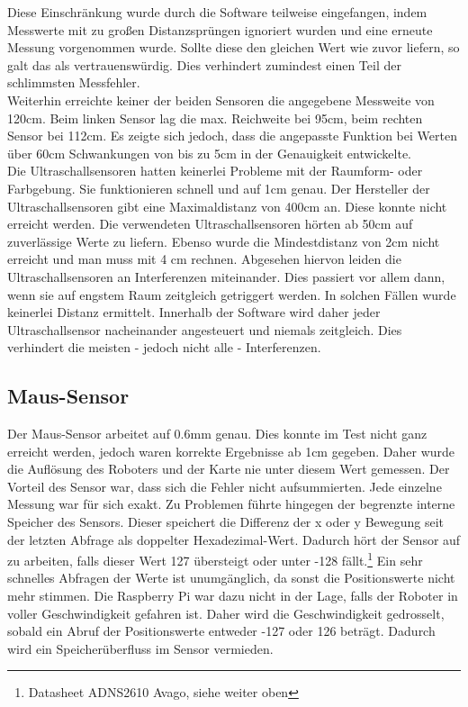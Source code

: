 \documentclass[twoside,11pt, a4paper]{report}
\begin{document}
	Diese Einschränkung wurde durch die Software teilweise eingefangen, indem Messwerte mit zu großen Distanzsprüngen ignoriert wurden und eine erneute Messung vorgenommen wurde. Sollte diese den gleichen Wert wie zuvor liefern, so galt das als vertrauenswürdig. Dies verhindert zumindest einen Teil der schlimmsten Messfehler. \\
	Weiterhin erreichte keiner der beiden Sensoren die angegebene Messweite von 120cm. Beim linken Sensor lag die max. Reichweite bei 95cm, beim rechten Sensor bei 112cm. Es zeigte sich jedoch, dass die angepasste Funktion bei Werten über 60cm Schwankungen von bis zu 5cm in der Genauigkeit entwickelte. \\
	
	Die Ultraschallsensoren hatten keinerlei Probleme mit der Raumform- oder Farbgebung. Sie funktionieren schnell und auf 1cm genau. Der Hersteller der Ultraschallsensoren gibt eine Maximaldistanz von 400cm an. Diese konnte nicht erreicht werden. Die verwendeten Ultraschallsensoren hörten ab 50cm auf zuverlässige Werte zu liefern. Ebenso wurde die Mindestdistanz von 2cm nicht erreicht und man muss mit 4 cm rechnen. Abgesehen hiervon leiden die Ultraschallsensoren an Interferenzen miteinander. Dies passiert vor allem dann, wenn sie auf engstem Raum zeitgleich getriggert werden. In solchen Fällen wurde keinerlei Distanz ermittelt. Innerhalb der Software wird daher jeder Ultraschallsensor nacheinander angesteuert und niemals zeitgleich. Dies verhindert die meisten - jedoch nicht alle - Interferenzen. 
	
	\subsection{Maus-Sensor}
	Der Maus-Sensor arbeitet auf 0.6mm genau. Dies konnte im Test nicht ganz erreicht werden, jedoch waren korrekte Ergebnisse ab 1cm gegeben. Daher wurde die Auflösung des Roboters und der Karte nie unter diesem Wert gemessen. Der Vorteil des Sensor war, dass sich die Fehler nicht aufsummierten. Jede einzelne Messung war für sich exakt. Zu Problemen führte hingegen der begrenzte interne Speicher des Sensors. Dieser speichert die Differenz der x oder y Bewegung seit der letzten Abfrage als doppelter Hexadezimal-Wert. Dadurch hört der Sensor auf zu arbeiten, falls dieser Wert 127 übersteigt oder unter -128 fällt.\footnote{Datasheet ADNS2610 Avago, siehe weiter oben} Ein sehr schnelles Abfragen der Werte ist unumgänglich, da sonst die Positionswerte nicht mehr stimmen. Die Raspberry Pi war dazu nicht in der Lage, falls der Roboter in voller Geschwindigkeit gefahren ist. Daher wird die Geschwindigkeit gedrosselt, sobald ein Abruf der Positionswerte entweder -127 oder 126 beträgt. Dadurch wird ein Speicherüberfluss im Sensor vermieden.  
	
\end{document}
